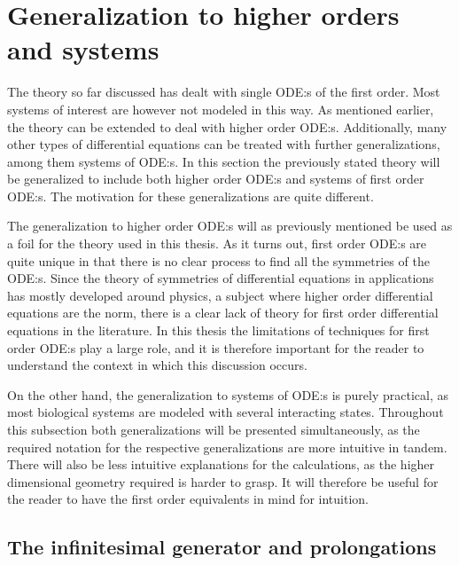 \section{Generalization to higher orders and systems}

The theory so far discussed has dealt with single ODE:s of the first order.
Most systems of interest are however not modeled in this way.
As mentioned earlier, the theory can be extended to deal with higher order ODE:s.
Additionally, many other types of differential equations can be treated with further generalizations, among them systems of ODE:s.
In this section the previously stated theory will be generalized to include both higher order ODE:s and systems of first order ODE:s.
The motivation for these generalizations are quite different.

The generalization to higher order ODE:s will as previously mentioned be used as a foil for the theory used in this thesis.
As it turns out, first order ODE:s are quite unique in that there is no clear process to find all the symmetries of the ODE:s.
Since the theory of symmetries of differential equations in applications has mostly developed around physics, a subject where higher order differential equations are the norm, there is a clear lack of theory for first order differential equations in the literature.
In this thesis the limitations of techniques for first order ODE:s play a large role, and it is therefore important for the reader to understand the context in which this discussion occurs.

On the other hand, the generalization to systems of ODE:s is purely practical, as most biological systems are modeled with several interacting states.
Throughout this subsection both generalizations will be presented simultaneously, as the required notation for the respective generalizations are more intuitive in tandem.
There will also be less intuitive explanations for the calculations, as the higher dimensional geometry required is harder to grasp.
It will therefore be useful for the reader to have the first order equivalents in mind for intuition.

\subsection{The infinitesimal generator and prolongations}

